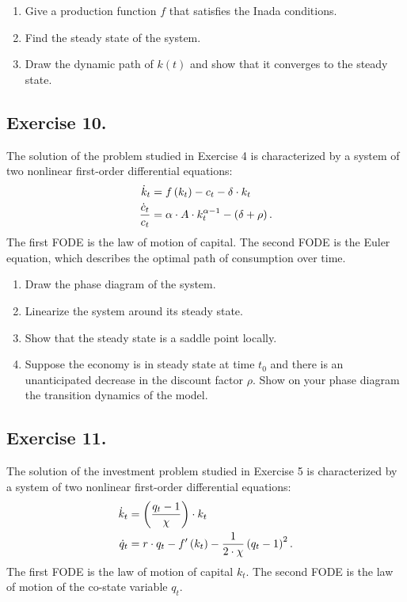 \documentclass[letterpaper,12pt,leqno]{article}
\begin{document}
\begin{enumerate}
\item Give a production function $f$ that satisfies the Inada conditions.
\item Find the steady state of the system.
\item Draw the dynamic path of $k(t) $ and show that it converges to the steady state.
\end{enumerate}

\subsection*{Exercise 10.}

The solution of the problem studied in Exercise 4 is characterized by a system of two nonlinear first-order differential equations:
\begin{align*}
\dot{k}_{t} &=f\left( k_{t} \right) -c_{t}-\delta \cdot k_{t}\\
\frac{\dot{c}_{t}}{c_{t}} &=\alpha \cdot  A \cdot k_{t}^{\alpha -1}-\left( \delta +\rho \right).
\end{align*}
The first FODE is the law of motion of capital. The second FODE is the Euler equation, which describes the optimal path of consumption over time.


\begin{enumerate}
\item Draw the phase diagram of the system.
\item Linearize the system around its steady state.
\item Show that the steady state is a saddle point  locally.
\item Suppose the economy is in steady state at time $t_{0}$ and there is an unanticipated decrease in the discount factor $\rho$. Show on your phase diagram the transition dynamics of the model.
\end{enumerate}

\subsection*{Exercise 11.}

The solution of the investment problem studied in Exercise 5 is characterized by a system of two nonlinear first-order differential equations:
\begin{align*}
\dot{k}_{t} &=\left( \frac{q_{t}-1}{\chi} \right)\cdot  k_{t} \\
\dot{q}_{t} &=r\cdot q_{t}-f'\left( k_{t} \right) -\frac{1}{2\cdot \chi}\left( q_{t}-1 \right)^{2}.
\end{align*}
The first FODE is the law of motion of capital $k_{t}$. The second FODE is the law of motion of the co-state variable $q_{t}$.
\end{document}
